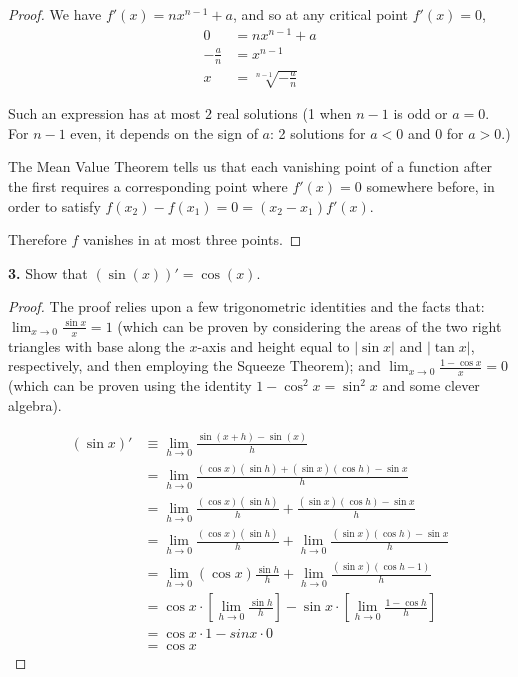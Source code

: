 \documentclass{article}
\newcommand{\abs}[1]{\left| #1 \right|}
\newcommand{\brac}[1]{\left[ #1 \right]}
\newcommand{\problem}[1]{\noindent \textbf{#1}}
\begin{document}
\begin{proof}
    We have $f'(x) = nx^{n - 1} + a$, and so at any critical point $f'(x) = 0$, 
    \begin{align*}
        0 &= nx^{n - 1} + a \\
        -\frac{a}{n} &= x^{n - 1} \\
        x &= \sqrt[n - 1]{-\frac{a}{n}}
    \end{align*}

    Such an expression has at most $2$ real solutions (1 when $n - 1$ is odd or $a = 0$. For $n - 1$ even, it depends on the sign of $a$: 2 solutions for $a < 0$ and $0$ for $a > 0$.)

    The Mean Value Theorem tells us that each vanishing point of a function after the first requires a corresponding point where $f'(x) = 0$ somewhere before, in order to satisfy $f(x_2) - f(x_1) = 0 = (x_2 - x_1)f'(x)$.

    Therefore $f$ vanishes in at most three points.    
\end{proof}


\problem{3. }
Show that $(\sin(x))' = \cos(x)$.
\begin{proof}
    The proof relies upon a few trigonometric identities and the facts that: $\lim_{x \to 0} \frac{\sin x}{x} = 1$ (which can be proven by considering the areas of the two right triangles with base along the $x$-axis and height equal to $\abs{\sin x}$ and $\abs{\tan x}$, respectively, and then employing the Squeeze Theorem); and $\lim_{x \to 0} \frac{1 - \cos x}{x} = 0$ (which can be proven using the identity $1 - \cos^2 x = \sin^2 x$ and some clever algebra).

\begin{align*}
    (\sin x)' &\equiv \lim_{h \to 0} \frac{\sin(x + h) - \sin(x)}{h} \\
    &= \lim_{h \to 0} \frac{(\cos x)(\sin h) + (\sin x)(\cos h) - \sin x}{h} \\
    &= \lim_{h \to 0} \frac{(\cos x)(\sin h)}{h} + \frac{(\sin x)(\cos h) - \sin x}{h} \\
    &= \lim_{h \to 0} \frac{(\cos x)(\sin h)}{h} + \lim_{h \to 0} \frac{(\sin x)(\cos h) - \sin x}{h} \\
    &= \lim_{h \to 0} (\cos x)\frac{\sin h}{h} + \lim_{h \to 0} \frac{(\sin x)(\cos h - 1)}{h} \\
    &= \cos x \cdot \brac{\lim_{h \to 0} \frac{\sin h}{h}} - \sin x \cdot \brac{\lim_{h \to 0} \frac{1 - \cos h}{h}} \\
    &= \cos x \cdot 1 - sin x \cdot 0 \\
    &= \cos x
\end{align*}
    
\end{proof}
\end{document}
